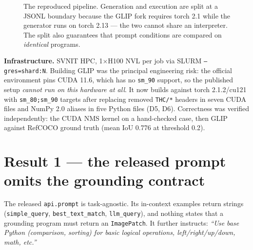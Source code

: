 \documentclass[11pt,a4paper]{article}
\begin{document}
\begin{figure}[htbp]
\caption{The reproduced pipeline. Generation and execution are split at a JSONL
boundary because the GLIP fork requires torch 2.1 while the generator runs on
torch 2.13 — the two cannot share an interpreter. The split also guarantees that
prompt conditions are compared on \emph{identical} programs.}
\label{fig:pipeline}
\end{figure}

\textbf{Infrastructure.} SVNIT HPC, 1$\times$H100 NVL per job via SLURM
\texttt{--gres=shard:N}. Building GLIP was the principal engineering risk: the
official environment pins CUDA 11.6, which has no \texttt{sm\_90} support, so the
published setup \emph{cannot run on this hardware at all}. It now builds against
torch 2.1.2/cu121 with \texttt{sm\_80;sm\_90} targets after replacing removed
\texttt{THC/*} headers in seven CUDA files and NumPy 2.0 aliases in five Python
files (D5, D6). Correctness was verified independently: the CUDA NMS kernel on a
hand-checked case, then GLIP against RefCOCO ground truth (mean IoU 0.776 at
threshold 0.2).

\section{Result 1 — the released prompt omits the grounding contract}

The released \texttt{api.prompt} is task-agnostic. Its in-context examples return
strings (\texttt{simple\_query}, \texttt{best\_text\_match}, \texttt{llm\_query}),
and nothing states that a grounding program must return an \texttt{ImagePatch}. It
further instructs: \emph{``Use base Python (comparison, sorting) for basic logical
operations, left/right/up/down, math, etc.''}
\end{document}
